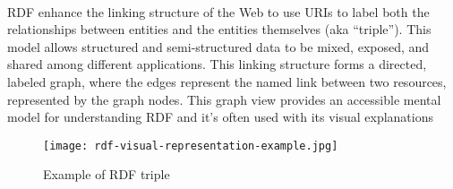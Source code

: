 \\
RDF enhance the linking structure of the Web to use URIs to label both the relationships between entities and the entities themselves (aka “triple”). This model allows structured and semi-structured data to be mixed, exposed, and shared among different applications.
This linking structure forms a directed, labeled graph, where the edges represent the named link between two resources, represented by the graph nodes. This graph view provides an accessible mental model for understanding RDF and it's often used with its visual explanations
\begin{figure}[htb]
  \centering
  \texttt{[image: rdf-visual-representation-example.jpg]}\\
  \caption{Example of RDF triple}\label{fig:RDFTriple}
\end{figure}

